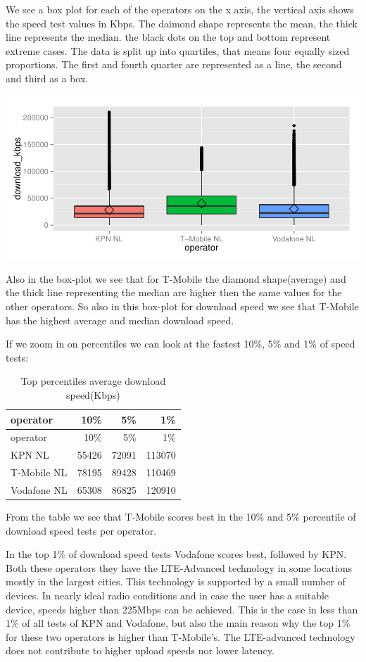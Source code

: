 \documentclass[]{article}
\begin{document}
We see a box plot for each of the operators on the x axis, the vertical
axis shows the speed test values in Kbps. The daimond shape represents
the mean, the thick line represents the median. the black dots on the
top and bottom represent extreme cases. The data is split up into
quartiles, that means four equally sized proportions. The first and
fourth quarter are represented as a line, the second and third as a box.

\includegraphics{speedtest-analysis_files/figure-latex/box-down-1.pdf}

Also in the box-plot we see that for T-Mobile the diamond shape(average)
and the thick line representing the median are higher then the same
values for the other operators. So also in this box-plot for download
speed we see that T-Mobile has the highest average and median download
speed.

If we zoom in on percentiles we can look at the fastest 10\%, 5\% and
1\% of speed tests:

\begin{longtable}[c]{@{}lrrr@{}}
\caption{Top percentiles average download speed(Kbps)}\tabularnewline
\toprule
operator & 10\% & 5\% & 1\%\tabularnewline
\midrule
\endfirsthead
\toprule
operator & 10\% & 5\% & 1\%\tabularnewline
\midrule
\endhead
KPN NL & 55426 & 72091 & 113070\tabularnewline
T-Mobile NL & 78195 & 89428 & 110469\tabularnewline
Vodafone NL & 65308 & 86825 & 120910\tabularnewline
\bottomrule
\end{longtable}

From the table we see that T-Mobile scores best in the 10\% and 5\%
percentile of download speed tests per operator.

In the top 1\% of download speed tests Vodafone scores best, followed by
KPN. Both these operators they have the LTE-Advanced technology in some
locations mostly in the largest cities. This technology is supported by
a small number of devices. In nearly ideal radio conditions and in case
the user has a suitable device, speeds higher than 225Mbps can be
achieved. This is the case in less than 1\% of all tests of KPN and
Vodafone, but also the main reason why the top 1\% for these two
operators is higher than T-Mobile's. The LTE-advanced technology does
not contribute to higher upload speeds nor lower latency.
\end{document}

